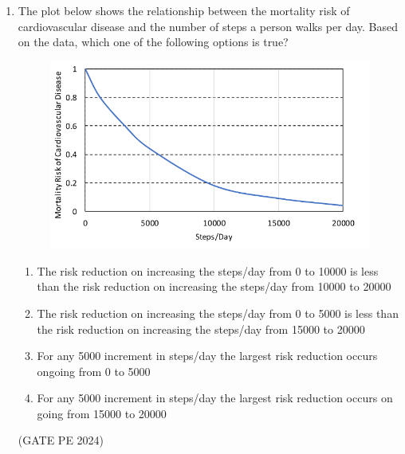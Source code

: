 \documentclass[journal,12pt,onecolumn]{IEEEtran}
\theoremstyle{remark}
\begin{document}
\begin{enumerate}
\item The plot below shows the relationship between the mortality risk of cardiovascular disease and the number of steps a person walks per day. Based on the data, which one of the following options is true?
\begin{figure}[H]
    \centering
    \includegraphics[width=0.5\columnwidth]{LQ_8.png}
    \caption{}
    \label{fig:placeholder}
\end{figure}
\begin{enumerate}
    \item The risk reduction on increasing the steps/day from 0 to 10000 is less than the risk reduction on increasing the steps/day from 10000 to 20000
    \item The risk reduction on increasing the steps/day from 0 to 5000 is less than  the risk reduction on increasing the steps/day from 15000 to 20000
    \item For any 5000 increment in steps/day the largest risk reduction occurs ongoing from 0 to 5000
    \item For any 5000 increment in steps/day the largest risk reduction occurs on going from 15000 to 20000
\end{enumerate}
\hfill{(GATE PE 2024)}


\end{enumerate}
\end{document}
